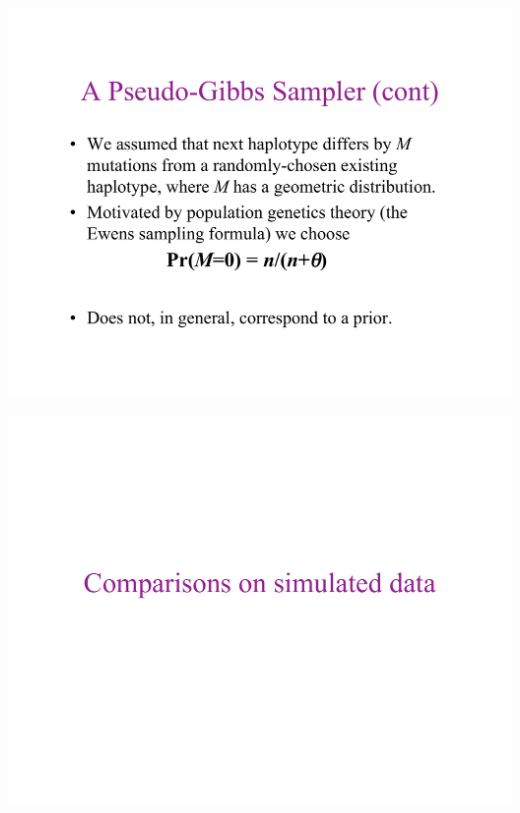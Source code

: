 \newslide{}
\mbox{}
\vspace*{\VertUp}
\enlargethispage*{1000pt}
\begin{center}
\includegraphics*[width=\textwidth]{PPT_pages/pg_0043.pdf}
\end{center}


\newslide{}
\mbox{}
\vspace*{\VertUp}
\enlargethispage*{1000pt}
\begin{center}
\includegraphics*[width=\textwidth]{PPT_pages/pg_0044.pdf}
\end{center}


